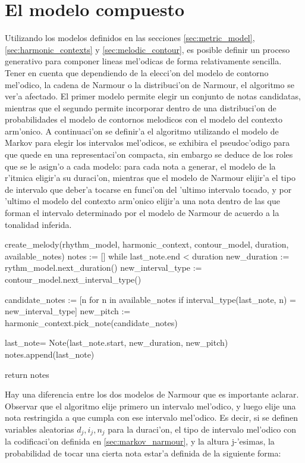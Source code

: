 \section{El modelo compuesto}
Utilizando los modelos definidos en las secciones \ref{sec:metric_model}, \ref{sec:harmonic_contexts} y \ref{sec:melodic_contour}, es posible definir
un proceso generativo para componer lineas mel'odicas de forma relativamente sencilla. 
Tener en cuenta que dependiendo de la elecci'on del modelo de contorno mel'odico, la cadena de Narmour o la distribuci'on de Narmour, el algoritmo se ver'a
afectado. El primer modelo permite elegir un conjunto de notas candidatas, mientras que el segundo permite incorporar dentro de una distribuci'on de 
probabilidades el modelo de contornos melodicos con el modelo del contexto arm'onico. 
A continuaci'on se definir'a el algoritmo utilizando el modelo de Markov para elegir los intervalos mel'odicos, se exhibira el pseudoc'odigo 
para que quede en una representaci'on compacta, sin embargo se deduce de los roles que se le asign'o a cada modelo: 
para cada nota a generar, el modelo de la r'itmica eligir'a su duraci'on, mientras que el modelo de Narmour elijir'a el tipo de intervalo que deber'a 
tocarse en funci'on del 'ultimo intervalo tocado, y por 'ultimo el modelo del contexto arm'onico elijir'a una nota dentro de las que forman 
el intervalo determinado por el modelo de Narmour de acuerdo a la tonalidad inferida.

\begin{algoritmo}
create_melody(rhythm_model, harmonic_context, contour_model, duration, available_notes)
    notes := []
    while last_note.end < duration
        new_duration := rythm_model.next_duration()
        new_interval_type := contour_model.next_interval_type()

        candidate_notes := [n for n in available_notes if interval_type(last_note, n) = new_interval_type]
        new_pitch := harmonic_context.pick_note(candidate_notes)

        last_note= Note(last_note.start, new_duration, new_pitch)
        notes.append(last_note) 

    return notes
\end{algoritmo}

Hay una diferencia entre los dos modelos de Narmour que es importante aclarar. Observar que el algoritmo elije primero un intervalo mel'odico, y luego
elije una nota restringida a que cumpla con ese intervalo mel'odico. Es decir, si se definen variables aleatorias $d_j, i_j, n_j$ para la duraci'on, 
el tipo de intervalo mel'odico con la codificaci'on definida en \ref{sec:markov_narmour}, y la altura j-'esimas, la probabilidad de tocar una cierta nota estar'a definida de la siguiente forma:

